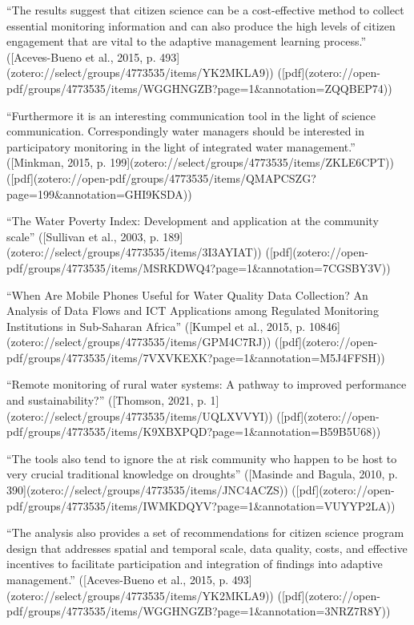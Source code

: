 

“The results suggest that citizen science can be a cost-effective method to collect essential monitoring information and can also produce the high levels of citizen engagement that are vital to the adaptive management learning process.” ([Aceves-Bueno et al., 2015, p. 493](zotero://select/groups/4773535/items/YK2MKLA9)) ([pdf](zotero://open-pdf/groups/4773535/items/WGGHNGZB?page=1&annotation=ZQQBEP74))

“Furthermore it is an interesting communication tool in the light of science communication. Correspondingly water managers should be interested in participatory monitoring in the light of integrated water management.” ([Minkman, 2015, p. 199](zotero://select/groups/4773535/items/ZKLE6CPT)) ([pdf](zotero://open-pdf/groups/4773535/items/QMAPCSZG?page=199&annotation=GHI9KSDA))


“The Water Poverty Index: Development and application at the community scale” ([Sullivan et al., 2003, p. 189](zotero://select/groups/4773535/items/3I3AYIAT)) ([pdf](zotero://open-pdf/groups/4773535/items/MSRKDWQ4?page=1&annotation=7CGSBY3V))

“When Are Mobile Phones Useful for Water Quality Data Collection? An Analysis of Data Flows and ICT Applications among Regulated Monitoring Institutions in Sub-Saharan Africa” ([Kumpel et al., 2015, p. 10846](zotero://select/groups/4773535/items/GPM4C7RJ)) ([pdf](zotero://open-pdf/groups/4773535/items/7VXVKEXK?page=1&annotation=M5J4FFSH))

“Remote monitoring of rural water systems: A pathway to improved performance and sustainability?” ([Thomson, 2021, p. 1](zotero://select/groups/4773535/items/UQLXVVYI)) ([pdf](zotero://open-pdf/groups/4773535/items/K9XBXPQD?page=1&annotation=B59B5U68))

“The tools also tend to ignore the at risk community who happen to be host to very crucial traditional knowledge on droughts” ([Masinde and Bagula, 2010, p. 390](zotero://select/groups/4773535/items/JNC4ACZS)) ([pdf](zotero://open-pdf/groups/4773535/items/IWMKDQYV?page=1&annotation=VUYYP2LA))

“The analysis also provides a set of recommendations for citizen science program design that addresses spatial and temporal scale, data quality, costs, and effective incentives to facilitate participation and integration of findings into adaptive management.” ([Aceves-Bueno et al., 2015, p. 493](zotero://select/groups/4773535/items/YK2MKLA9)) ([pdf](zotero://open-pdf/groups/4773535/items/WGGHNGZB?page=1&annotation=3NRZ7R8Y))

